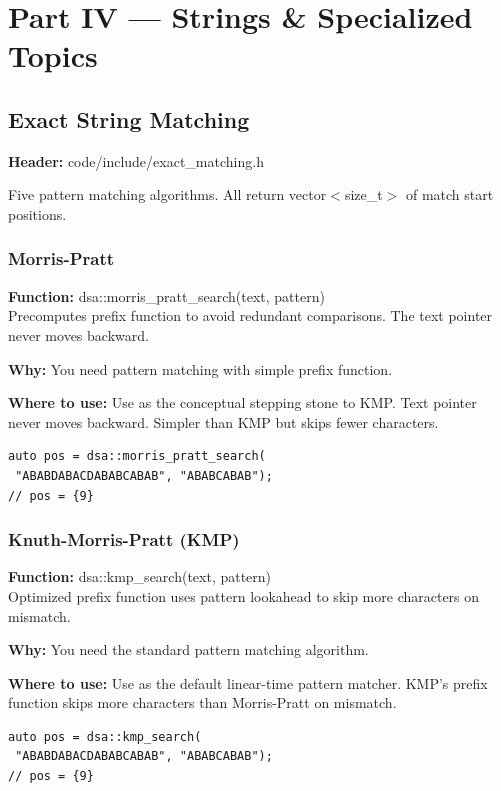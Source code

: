 \documentclass[11pt]{article}
\begin{document}
\section{Part IV --- Strings \& Specialized Topics}

\subsection{Exact String Matching}
\textbf{Header:} code/include/exact\_matching.h

Five pattern matching algorithms. All return vector$<$size\_t$>$ of match start positions.

\subsubsection{Morris-Pratt}
\textbf{Function:} dsa::morris\_pratt\_search(text, pattern)\\

Precomputes prefix function to avoid redundant comparisons. The text pointer never moves backward.

\textbf{Why:} You need pattern matching with simple prefix function. \par \textbf{Where to use:} Use as the conceptual stepping stone to KMP. Text pointer never moves backward. Simpler than KMP but skips fewer characters.

\begin{lstlisting}
auto pos = dsa::morris_pratt_search(
 "ABABDABACDABABCABAB", "ABABCABAB");
// pos = {9}
\end{lstlisting}

\subsubsection{Knuth-Morris-Pratt (KMP)}
\textbf{Function:} dsa::kmp\_search(text, pattern)\\

Optimized prefix function uses pattern lookahead to skip more characters on mismatch.

\textbf{Why:} You need the standard pattern matching algorithm. \par \textbf{Where to use:} Use as the default linear-time pattern matcher. KMP's prefix function skips more characters than Morris-Pratt on mismatch.

\begin{lstlisting}
auto pos = dsa::kmp_search(
 "ABABDABACDABABCABAB", "ABABCABAB");
// pos = {9}
\end{lstlisting}
\end{document}
